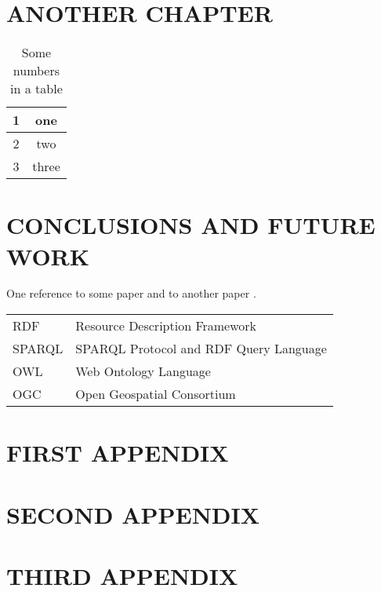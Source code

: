 \documentclass[inscr,ack,preface]{dithesis}
\begin{document}
\chapter{ANOTHER CHAPTER}
  \lipsum[10-20]

  \begin{table}
    \centering

    \caption{Some numbers in a table}
    \label{numbers}

    \begin{tabular}{| c | c |}
      \hline
      1 & one \\
      \hline
      2 & two \\
      \hline
      3 & three \\
      \hline
    \end{tabular}

  \end{table}

\chapter{CONCLUSIONS AND FUTURE WORK}
  \lipsum[3-5]
  One reference to some paper \cite{manning:corenlp} and to another paper
  \cite{pennington:glove}.

\backmatter

\abbreviations
\begin{center}
	\renewcommand{\arraystretch}{1.5}
	\begin{longtable}{ l @{\qquad} l }
	\toprule
	RDF    & Resource Description Framework \\
	SPARQL & SPARQL Protocol and RDF Query Language \\
	OWL    & Web Ontology Language \\
	OGC    & Open Geospatial Consortium \\
	\bottomrule
	\end{longtable}
\end{center}

\begin{appendix}
\appendixstartedtrue

{}

\chapter{FIRST APPENDIX}
\chapter{SECOND APPENDIX}
\chapter{THIRD APPENDIX}
\end{appendix}


{\footnotesize }

\end{document}

